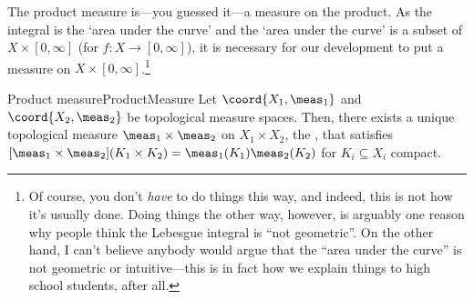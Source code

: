 The product measure is---you guessed it---a measure on the product.  As the integral is the `area under the curve' and the `area under the curve' is a subset of $X\times [0,\infty ]$ (for $f\colon X\rightarrow [0,\infty ]$), it is necessary for our development to put a measure on $X\times [0,\infty ]$.\footnote{Of course, you don't \emph{have} to do things this way, and indeed, this is not how it's usually done.  Doing things the other way, however, is arguably one reason why people think the Lebesgue integral is ``not geometric''.  On the other hand, I can't believe anybody would argue that the ``area under the curve'' is not geometric or intuitive---this is in fact how we explain things to high school students, after all.}
\begin{thm}{Product measure}{ProductMeasure}
Let $\coord{X_1,\meas _1}$ and $\coord{X_2,\meas _2}$ be topological measure spaces.  Then, there exists a unique topological measure $\meas _1\times \meas _2$ on $X_1\times X_2$, the , that satisfies $[\meas _1\times \meas _2](K_1\times K_2)=\meas _1(K_1)\meas _2(K_2)$ for $K_i\subseteq X_i$ compact.


\end{thm}
